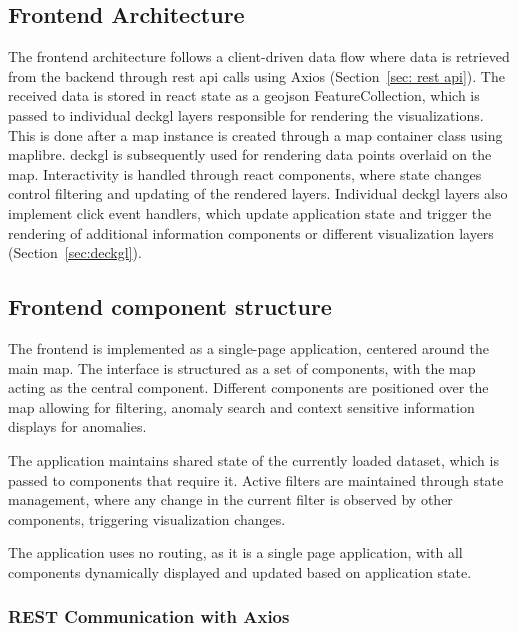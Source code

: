 \subsection{Frontend Architecture}

The frontend architecture follows a client-driven data flow where data is retrieved from the backend through \acrshort{rest} \acrshort{api} calls using Axios (Section~\ref{sec: rest api}). The received data is stored in \gls{react} state as a \acrshort{geojson} FeatureCollection, which is passed to individual \gls{deckgl} layers responsible for rendering the visualizations. This is done after a map instance is created through a map container class using \gls{maplibre}. \gls{deckgl} is subsequently used for rendering data points overlaid on the map. Interactivity is handled through \gls{react} components, where state changes control filtering and updating of the rendered layers. Individual \gls{deckgl} layers also implement click event handlers, which update application state and trigger the rendering of additional information components or different visualization layers (Section~\ref{sec:deckgl}).

\subsection{Frontend component structure}


The frontend is implemented as a single-page application, centered around the main map. The interface is structured as a set of components, with the map acting as the central component. Different components are positioned over the map allowing for filtering, anomaly search and context sensitive information displays for anomalies.  


The application maintains shared state of the currently loaded dataset, which is passed to components that require it. Active filters are maintained through state management, where any change in the current filter is observed by other components, triggering visualization changes. 


The application uses no routing, as it is a single page application, with all components dynamically displayed and updated based on application state. 

\subsubsection{REST Communication with Axios}

